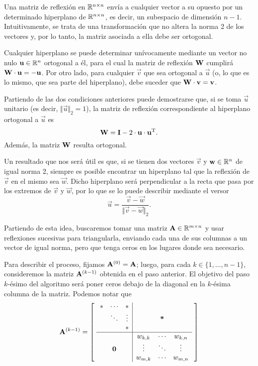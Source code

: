 Una matriz de reflexión en $\mathbb{R}^{n \times n}$ envía a cualquier vector
a su opuesto por un determinado hiperplano de $\mathbb{R}^{n \times n}$, es
decir, un subespacio de dimensión $n-1$. Intuitivamente, se trata de una
transformación que no altera la norma 2 de los vectores y, por lo tanto,
la matriz asociada a ella debe ser ortogonal.

Cualquier hiperplano se puede determinar unívocamente mediante
un vector no nulo $\mathbf{u} \in \mathbb{R}^{n}$ ortogonal a él, para el cual la
matriz de reflexión $\mathbf{W}$ cumplirá $\mathbf{W} \cdot \mathbf{u} = - \mathbf{u}$.
Por otro lado, para cualquier $\vec{v}$ que sea ortogonal a $\vec{u}$ (o, lo
que es lo mismo, que sea parte del hiperplano), debe suceder que
$\mathbf{W} \cdot \mathbf{v} = \mathbf{v}$.

Partiendo de las dos condiciones anteriores puede demostrarse que, si
se toma $\vec{u}$ unitario (es decir, $\Vert \vec{u} \Vert_2 = 1$),
la matriz de reflexión correspondiente al hiperplano
ortogonal a $\vec{u}$ es
\[ \mathbf{W} = \mathbf{I} - 2 \cdot \mathbf{u} \cdot \mathbf{u}^{\mathrm{T}}. \]
Además, la matriz $\mathbf{W}$ resulta ortogonal.

Un resultado que nos será útil es que, si se tienen dos vectores $\vec{v}$ y
$\mathbf{w} \in \mathbb{R}^n$ de igual norma 2, siempre es posible encontrar un
hiperplano tal que la reflexión de $\vec{v}$ en el mismo sea $\vec{w}$.
Dicho hiperplano será perpendicular a la recta que pasa por los extremos de
$\vec{v}$ y $\vec{w}$, por lo que se lo puede describir mediante el versor
\[ \vec{u} = \frac{\vec{v} - \vec{w}}{\Vert \vec{v} - \vec{w} \Vert_2}. \]

Partiendo de esta idea, buscaremos tomar una matriz
$\mathbf{A} \in \mathbb{R}^{m \times n}$ y usar reflexiones sucesivas para
triangularla, enviando cada una de sus columnas a
un vector de igual norma, pero que tenga ceros en los lugares donde sea
necesario.

Para describir el proceso, fijamos $\mathbf{A}^{(0)} = \mathbf{A}$; luego, para
cada $k \in \{1,\dots,n-1\}$, consideremos la matriz $\mathbf{A}^{(k-1)}$
obtenida en el paso anterior.
El objetivo del paso $k$-ésimo del algoritmo será poner ceros debajo de
la diagonal en la $k$-ésima columna de la matriz. Podemos notar que
\[
\mathbf{A}^{(k-1)} = \left[ \hspace{.1cm} \begin{array}{ccc|ccc}
    \ast & \cdots  & \ast   &         &            &         \\
         & \ddots  & \vdots &         & \textbf{*} &         \\
         &         & \ast   &         &            &         \\ \hline
         &         &        & w_{k,k} & \cdots     & w_{k,n} \\
         & \mathbf{0} &        & \vdots  & \ddots     & \vdots  \\
         &         &        & w_{m,k} & \cdots     & w_{m,n} \\
\end{array} \hspace{.1cm} \right]
\]

